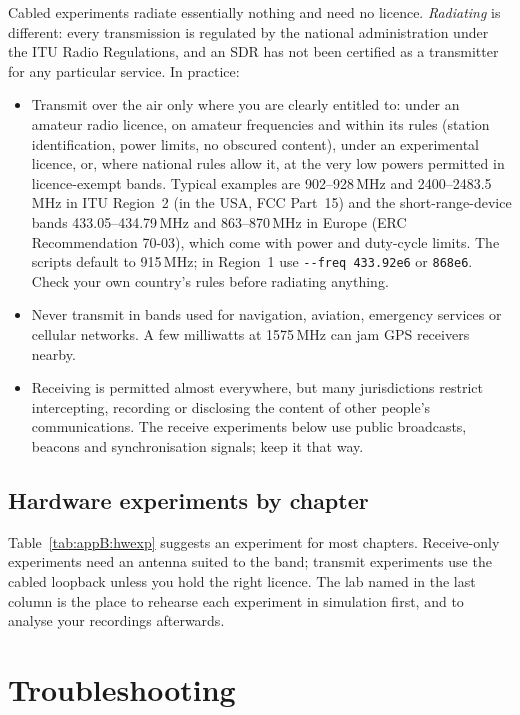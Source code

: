 Cabled experiments radiate essentially nothing and need no licence. \emph{Radiating} is different:
every transmission is regulated by the national administration under the ITU Radio Regulations, and
an SDR has not been certified as a transmitter for any particular service. In practice:
\begin{itemize}[leftmargin=1.5em,itemsep=2pt]
\item Transmit over the air only where you are clearly entitled to: under an amateur radio licence,
on amateur frequencies and within its rules (station identification, power limits, no obscured
content), under an experimental licence, or, where national rules allow it, at the very low powers
permitted in licence-exempt bands. Typical examples are 902--928\,MHz and 2400--2483.5\,MHz in ITU
Region~2 (in the USA, FCC Part~15) and the short-range-device bands 433.05--434.79\,MHz and
863--870\,MHz in Europe (ERC Recommendation 70-03), which come with power and duty-cycle limits. The
scripts default to 915\,MHz; in Region~1 use \texttt{-{}-freq 433.92e6} or \texttt{868e6}. Check your own
country's rules before radiating anything.
\item Never transmit in bands used for navigation, aviation, emergency services or cellular
networks. A few milliwatts at 1575\,MHz can jam GPS receivers nearby.
\item Receiving is permitted almost everywhere, but many jurisdictions restrict intercepting, recording
or disclosing the content of other people's communications. The receive experiments below use public
broadcasts, beacons and synchronisation signals; keep it that way.
\end{itemize}

\subsection{Hardware experiments by chapter}

Table~\ref{tab:appB:hwexp} suggests an experiment for most chapters. Receive-only experiments need an
antenna suited to the band; transmit experiments use the cabled loopback unless you hold the right
licence. The lab named in the last column is the place to rehearse each experiment in simulation
first, and to analyse your recordings afterwards.

\section{Troubleshooting}
\label{sec:appB:trouble}

